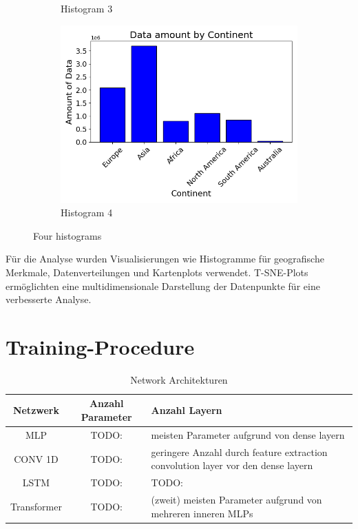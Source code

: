 \documentclass[manuscript,screen,review]{acmart}
\begin{document}
\begin{figure}[htp]
\begin{subfigure}{.45\textwidth}
      \caption{Histogram 3}
      \label{fig:sub3}
  \end{subfigure}%
  \begin{subfigure}{.45\textwidth}
      \centering
      \includegraphics[width=.8\linewidth]{./histograms/Continents}
      \caption{Histogram 4}
      \label{fig:sub4}
  \end{subfigure}
  \caption{Four histograms}
  \label{fig:test}
\end{figure}

Für die Analyse wurden Visualisierungen wie Histogramme für geografische Merkmale, Datenverteilungen und Kartenplots verwendet. T-SNE-Plots ermöglichten eine multidimensionale Darstellung der Datenpunkte für eine verbesserte Analyse.



\section{Training-Procedure}

\begin{table}
  \caption{Network Architekturen}
  \label{tab:freq}
  \begin{tabular}{ccl}
    \toprule
    Netzwerk&Anzahl Parameter&Anzahl Layern\\
    \midrule
    MLP & TODO: & meisten Parameter aufgrund von dense layern\\
    CONV 1D & TODO: & geringere Anzahl durch feature extraction convolution layer vor den dense layern\\
    LSTM & TODO: & TODO:\\
    Transformer & TODO: & (zweit) meisten Parameter aufgrund von mehreren inneren MLPs\\
  \bottomrule
\end{tabular}
\end{table}
\end{document}
